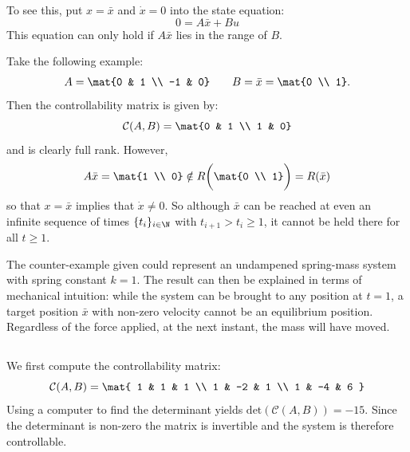 \documentclass{homework}
\begin{document}
\begin{letterenum}
    To see this, put $x = \bar{x}$ and $\dot x = 0$ into the state equation:
    \begin{equation*}
        0 = A \bar{x} + Bu
    \end{equation*}
    This equation can only hold if $A \bar{x}$ lies in the range of $B$. 

    Take the following example:
    \begin{equation*}
        A = \mat{0 & 1 \\ -1 & 0} \qquad B = \bar x = \mat{0 \\ 1}.
    \end{equation*}
    Then the controllability matrix is given by:
    \begin{equation*}
        \mathcal{C}(A, B) = \mat{0 & 1 \\ 1 & 0}
    \end{equation*}
    and is clearly full rank. However,
    \begin{equation*}
        A \bar{x} = \mat{1 \\ 0} \notin R\biggl(\mat{0 \\ 1}\biggr) = R(\bar x)
    \end{equation*}
    so that $x = \bar x$ implies that $\dot{x} \neq 0$. So although
    $\bar{x}$ can be reached at even an infinite sequence of times
    $\{t_i \}_{i \in \N}$ with $t_{i+1} > t_i \geq 1$,
    it cannot be held there for all $t \geq 1$.

    The counter-example given could represent an undampened spring-mass system with 
    spring constant $k=1$. The result can then be explained in terms
    of mechanical intuition: while the system can be brought to any
    position at $t=1$, a target position $\bar x$ with non-zero velocity
    cannot be an equilibrium position. Regardless of the force applied, at the
    next instant, the mass will have moved.
\end{letterenum}

\subsection{}

\newcommand{\detr}{\text{det}}
We first compute the controllability matrix:
\begin{equation*}
    \mathcal{C}(A, B) = \mat{
        1 & 1 & 1 \\
        1 & -2 & 1 \\
        1 & -4 & 6
    }
\end{equation*}
Using a computer to find the determinant yields $\detr(\mathcal{C}(A, B)) = -15$.
Since the determinant is non-zero the matrix is invertible and the system
is therefore controllable.
\end{document}
